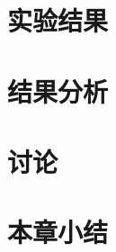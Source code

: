 \section{实验结果}
\label{sec:results}

\section{结果分析}
\label{sec:analysis}

\section{讨论}
\label{sec:discussion}

\section{本章小结}
\label{sec:res_summary}
